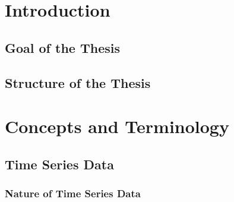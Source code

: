 \renewcommand*\contentsname{Table of Contents}
\tableofcontents
\thispagestyle{empty}
 
 \null\newpage
{} 






\thispagestyle{empty}
\null\newpage
{} 
\section{Introduction}

\subsection{Goal of the Thesis}

\subsection{Structure of the Thesis}



% 

\null\newpage

\section{Concepts and Terminology}

\subsection{Time Series Data}

\subsubsection{Nature of Time Series Data}

